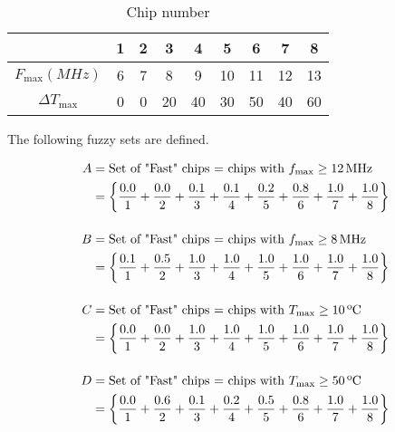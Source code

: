 \documentclass{article}
\begin{document}
\begin{enumerate}
        \begin{table}[H]
          \centering
          \caption{Chip number}
          \begin{tabular}{ccccccccc}
            \toprule
                                      & 1 & 2 & 3  & 4  & 5  & 6  & 7  & 8  \\
            \midrule
            $F_{\mathrm{max}} (MHz)$  & 6 & 7 & 8  & 9  & 10 & 11 & 12 & 13 \\
            $\Delta T_{\mathrm{max}}$ & 0 & 0 & 20 & 40 & 30 & 50 & 40 & 60 \\
            \bottomrule
          \end{tabular}
        \end{table}

        The following fuzzy sets are defined.

        \begin{align*}
          A & = \text{Set of "Fast" chips = chips with } {\mathnormal{f}}_{\mathrm{max}} \geq 12 \, \mathrm{MHz} \\
            & = \left\{
          \frac{0.0}{1} +
          \frac{0.0}{2} +
          \frac{0.1}{3} +
          \frac{0.1}{4} +
          \frac{0.2}{5} +
          \frac{0.8}{6} +
          \frac{1.0}{7} +
          \frac{1.0}{8}
          \right\}                                                                                               \\[12pt]
          B & = \text{Set of "Fast" chips = chips with } {\mathnormal{f}}_{\mathrm{max}} \geq 8 \, \mathrm{MHz}  \\
            & = \left\{
          \frac{0.1}{1} +
          \frac{0.5}{2} +
          \frac{1.0}{3} +
          \frac{1.0}{4} +
          \frac{1.0}{5} +
          \frac{1.0}{6} +
          \frac{1.0}{7} +
          \frac{1.0}{8}
          \right\}                                                                                               \\[12pt]
          C & = \text{Set of "Fast" chips = chips with } {T}_{\mathrm{max}} \geq 10 \, \text{ºC}                 \\
            & = \left\{
          \frac{0.0}{1} +
          \frac{0.0}{2} +
          \frac{1.0}{3} +
          \frac{1.0}{4} +
          \frac{1.0}{5} +
          \frac{1.0}{6} +
          \frac{1.0}{7} +
          \frac{1.0}{8}
          \right\}                                                                                               \\[12pt]
          D & = \text{Set of "Fast" chips = chips with } {T}_{\mathrm{max}} \geq 50 \, \text{ºC}                 \\
            & = \left\{
          \frac{0.0}{1} +
          \frac{0.6}{2} +
          \frac{0.1}{3} +
          \frac{0.2}{4} +
          \frac{0.5}{5} +
          \frac{0.8}{6} +
          \frac{1.0}{7} +
          \frac{1.0}{8}
          \right\}
        \end{align*}


\end{enumerate}
\end{document}
